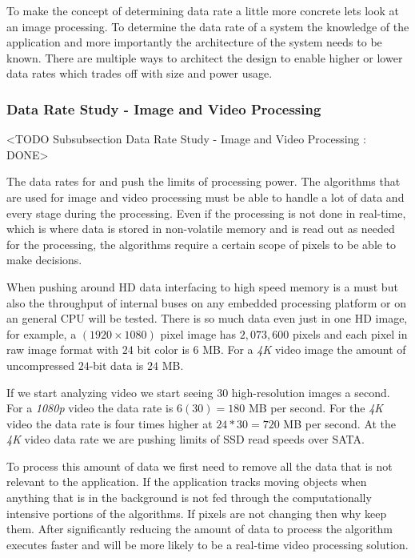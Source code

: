 To make the concept of determining data rate a little more concrete lets look at an image processing. To determine the data rate of a system the knowledge of the application and more importantly the architecture of the system needs to be known. There are multiple ways to architect the design to enable higher or lower data rates which trades off with size and power usage. 

\subsubsection{Data Rate Study - Image and Video Processing}
	<TODO Subsubsection  Data Rate Study - Image and Video Processing : DONE>

The data rates for  and  push the limits of processing power. The algorithms that are used for image and video processing must be able to handle a lot of data and every stage during the processing. Even if the processing is not done in real-time, which is where data is stored in non-volatile memory and is read out as needed for the processing, the algorithms require a certain scope of pixels to be able to make decisions.

When pushing around \ac{HD} data interfacing to high speed memory is a must but also the throughput of internal buses on any embedded processing platform or on an general \ac{CPU} will be tested. There is so much data even just in one \ac{HD} image, for example, a $(1920\times1080)$ pixel image has $2,073,600$ pixels and each pixel in raw image format with $24$ bit color is $6$ \ac{MB}. For a \emph{4K} video image the amount of uncompressed $24$-bit data is $24$ \ac{MB}.

If we start analyzing video we start seeing $30$ high-resolution images a second. For a \emph{1080p} video the data rate is $6(30)=180$ \ac{MB} per second. For the \emph{4K} video the data rate is four times higher at $24*30=720$ \ac{MB} per second. At the \emph{4K} video data rate we are pushing limits of \ac{SSD} read speeds over \ac{SATA}.

To process this amount of data we first need to remove all the data that is not relevant to the application. If the application tracks moving objects when anything that is in the background is not fed through the computationally intensive portions of the algorithms. If pixels are not changing then why keep them. After significantly reducing the amount of data to process the algorithm executes faster and will be more likely to be a real-time video processing solution.
	
